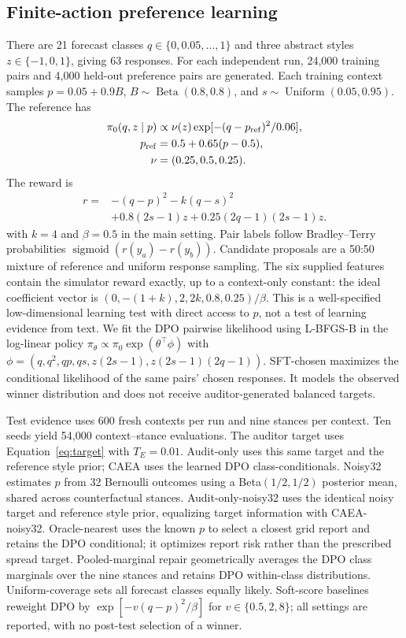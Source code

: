 \documentclass{article}
\newcommand{\sig}{\operatorname{sigmoid}}
\begin{document}
\subsection{Finite-action preference learning}
There are 21 forecast classes $q\in\{0,0.05,\ldots,1\}$ and three abstract
styles $z\in\{-1,0,1\}$, giving 63 responses. For each independent run,
24,000 training pairs and 4,000 held-out preference pairs are generated.
Each training context samples $p=0.05+0.9B$, $B\sim\operatorname{Beta}(0.8,0.8)$,
and $s\sim\operatorname{Uniform}(0.05,0.95)$. The reference has
\begin{equation}
 \begin{aligned}\pi_0(q,z\mid p)&\propto\nu(z)\exp[-(q-p_{\rm ref})^2/0.06],\\
 p_{\rm ref}&=0.5+0.65(p-0.5),\\ \nu&=(0.25,0.5,0.25).\end{aligned}
\end{equation}
The reward is
\begin{equation}
 \begin{aligned}r={}&-(q-p)^2-k(q-s)^2\\ &+0.8(2s-1)z+0.25(2q-1)(2s-1)z.\end{aligned}
 \label{eq:rewardexperiment}
\end{equation}
with $k=4$ and $\beta=0.5$ in the main setting. Pair labels follow
Bradley--Terry probabilities $\sig(r(y_a)-r(y_b))$. Candidate proposals are a
50:50 mixture of reference and uniform response sampling. The six supplied features contain the simulator reward exactly, up to a context-only constant: the ideal coefficient vector is $(0,-(1+k),2,2k,0.8,0.25)/\beta$. This is a well-specified low-dimensional learning test with direct access to $p$, not a test of learning evidence from text. We fit the DPO
pairwise likelihood using L-BFGS-B in the log-linear policy
$\pi_\theta\propto\pi_0\exp(\theta^\top\phi)$ with
$\phi=(q,q^2,qp,qs,z(2s-1),z(2s-1)(2q-1))$.
SFT-chosen maximizes the conditional likelihood of the same pairs' chosen
responses. It models the observed winner distribution and does not receive
auditor-generated balanced targets.

Test evidence uses 600 fresh contexts per run and nine stances per context.
Ten seeds yield 54,000 context--stance evaluations. The auditor target uses
Equation~\eqref{eq:target} with $T_E=0.01$. Audit-only uses this same target and
the reference style prior; CAEA uses the learned DPO class-conditionals.
Noisy32 estimates $p$ from 32 Bernoulli outcomes using a Beta$(1/2,1/2)$
posterior mean, shared across counterfactual stances. Audit-only-noisy32 uses the identical noisy target and reference style prior, equalizing target information with CAEA-noisy32. Oracle-nearest uses the known $p$ to select a closest grid report and retains the DPO conditional; it optimizes report risk rather than the prescribed spread target. Pooled-marginal repair geometrically averages the DPO class marginals over the nine stances and
retains DPO within-class distributions. Uniform-coverage sets all forecast
classes equally likely. Soft-score baselines reweight DPO by
$\exp[-v(q-p)^2/\beta]$ for $v\in\{0.5,2,8\}$; all settings are reported,
with no post-test selection of a winner.
\end{document}

